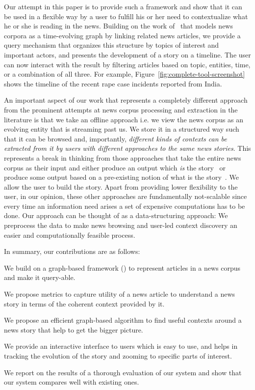 Our attempt in this paper is to provide such a framework and show that
it can be used in a flexible way by a user to fulfill his or her need
to contextualize what he or she is reading in the news.  Building on
the work of~\cite{choudhary@ecir2008} that models news corpora as a
time-evolving graph by linking related news articles, we provide a
query mechanism that organizes this structure by topics of interest
and important actors, and presents the development of a story on a
timeline. The user can now interact with the result by filtering
articles based on topic, entities, time, or a combination of all
three. For example, Figure~\ref{fig:complete-tool-screenshot} shows
the timeline of the recent rape case incidents reported from India.

An important aspect of our work that represents a completely different
approach from the prominent attempts at news corpus processing and
extraction in the literature is that we take an offline approach
i.e. we view the news corpus as an evolving entity that is streaming
past us. We store it in a structured way such that it can be browsed
and, importantly, {\em different kinds of contexts can be extracted
  from it by users with different approaches to the same news
  stories}. This represents a break in thinking from those approaches
that take the entire news corpus as their input and either produce an
output which {\em is} the story~\cite{shahaf@kdd2010,shahaf@www2012}
or produce some output based on a pre-existing notion of what is the
story~\cite{subasic-icdm:2008,subasic-ida:2013}. We allow the user to
build the story. Apart from providing lower flexibility to the user,
in our opinion, these other approaches are fundamentally not-scalable
since every time an information need arises a set of expensive
computations has to be done. Our approach can be thought of as a
data-structuring approach: We preprocess the data to make news
browsing and user-led context discovery an easier and computationally
feasible process.

In summary, our contributions are as follows:
\squishlist
\item We build on a graph-based framework (\cite{choudhary@ecir2008}) to represent articles in a news corpus and make it query-able. 
\item We propose metrics to capture utility of a news article to understand a news story in terms of the coherent context provided by it.
\item We propose an efficient graph-based algorithm to find useful contexts around a news story that help to get the bigger picture.
\item We provide an interactive interface to users which is easy to use, and helps in tracking the evolution of the story and zooming
  to specific parts of interest.
\item We report on the results of a thorough evaluation of our system and show that our system compares well with existing ones.
\squishend

